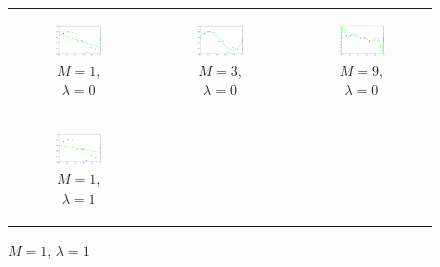 \documentclass{sigchi}
\begin{document}
\begin{figure}[!t]
\centering
\begin{tabular}{c c c}
\begin{subfigure}[b]{2.25in}
	\includegraphics[width = 2.25in]{3-1-0.png}
	\caption{$M = 1$, $\lambda = 0$}
\end{subfigure} &

\begin{subfigure}[b]{2.25in}
	\includegraphics[width = 2.25in]{3-3-0.png}
	\caption{$M = 3$, $\lambda = 0$}
\end{subfigure} &

\begin{subfigure}[b]{2.25in}
	\includegraphics[width = 2.25in]{3-9-0.png}
	\caption{$M = 9$, $\lambda = 0$}
\end{subfigure} \\


\begin{subfigure}[b]{2.25in}
	\includegraphics[width = 2.25in]{3-1-1.png}
	\caption{$M = 1$, $\lambda = 1$}
\end{subfigure} &


\end{tabular}
\end{figure}
\end{document}
